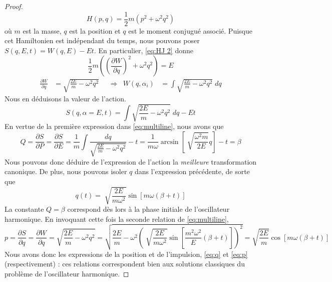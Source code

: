 \documentclass[11pt,oneside,a4paper]{article}
\newcommand{\dif}[2]{\frac{\partial #1}{\partial #2}}
\begin{document}
    \begin{proof}
      \begin{equation}
        H(p,q) = \frac{1}{2}m\left(p^2+\omega^2q^2\right)\label{eq: OH}
      \end{equation}
      où $m$ est la masse, $q$ est la position et $q$ est le moment conjugué associé. Puisque cet Hamiltonien est indépendant du temps, nous pouvons poser $S(q,E,t) = W(q,E) - Et$. En particulier, \eqref{eq:HJ 2} donne
      \begin{equation}
        \frac{1}{2}m\left(\left(\dif{W}{q}\right)^2+\omega^2q^2\right) = E
      \end{equation}
      \begin{align}
        \dif{W}{q} &= \sqrt{\frac{2E}{m}-\omega^2q^2} & &\Rightarrow & W(q,\alpha_i) &= \int \sqrt{\frac{2E}{m}-\omega^2q^2} \; dq
      \end{align}
      Nous en déduisons la valeur de l'action.
      \begin{equation}
        S(q,\alpha = E,t) = \int \sqrt{\frac{2E}{m}-\omega^2q^2} \; dq - Et
      \end{equation}
      En vertue de la première expression dans \eqref{eq:multiline}, nous avons que
      \begin{equation}
        Q = \dif{S}{P} = \dif{S}{E} = \frac{1}{m}\int\frac{dq}{\sqrt{\frac{2E}{m}-\omega^2q^2}} - t = \frac{1}{m\omega}\arcsin\left[\sqrt[]{\frac{\omega^2 m}{2E}}q\right] - t = \beta
      \end{equation}
      Nous pouvons donc déduire de l'expression de l'action la \emph{meilleure} transformation canonique. De plus, nous pouvons isoler $q$ dans l'expression précédente, de sorte que
      \begin{equation}
        q(t) = \sqrt[]{\frac{2E}{m\omega^2}}\sin\left[m\omega\left(\beta+t\right)\right]\label{eq:q}
      \end{equation}
      La constante $Q = \beta$ correspond dès lors à la phase initiale de l'oscillateur harmonique. En invoquant cette fois la seconde relation de \eqref{eq:multiline},
      \begin{equation}
        p = \dif{S}{q} = \dif{W}{q} = \sqrt{\frac{2E}{m}-\omega^2q^2} = \sqrt{\frac{2E}{m}-\omega^2\left(\sqrt[]{\frac{2E}{m\omega^2}}\sin\left[\frac{m^2\omega^2}{E}\left(\beta+t\right)\right]\right)^2} = \sqrt{\frac{2E}{m}}\cos\left[m\omega\left(\beta+t\right)\right]\label{eq:p}
      \end{equation}
      Nous avons donc les expressions de la position et de l'impulsion, \eqref{eq:q} et \eqref{eq:p} (respectivement) : ces relations correspondent bien aux solutions classiques du problème de l'oscillateur harmonique.  
    \end{proof}
\end{document}
